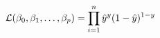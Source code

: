 \documentclass[preview]{standalone}
\begin{document}
\begin{align*}
\special{dvisvgm:raw <g id='unique000'>}\mathcal{L}(\beta_0, \beta_1, \dots, \beta_p)=\prod^n_{i=1}\hat{y}^y(1-\hat{y})^{1-y}\special{dvisvgm:raw </g>}
\end{align*}
\end{document}
